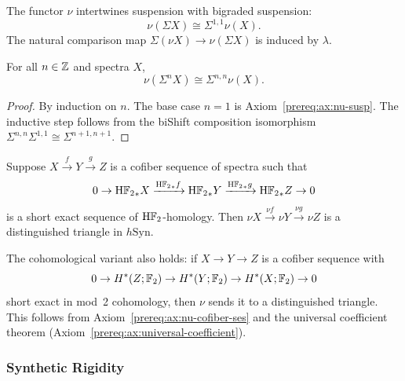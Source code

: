 \begin{axiom}\label{prereq:ax:nu-susp}
    \leanok
    The functor $\nu$ intertwines suspension with bigraded suspension:
    $$\nu(\Sigma X) \cong \Sigma^{1,1} \nu(X).$$
    The natural comparison map $\Sigma(\nu X) \to \nu(\Sigma X)$ is induced by $\lambda$.
\end{axiom}

\begin{theorem}\label{prereq:thm:nu-shift-bishift}
    For all $n \in {\mathbb Z}$ and spectra $X$,
    $$\nu(\Sigma^n X) \cong \Sigma^{n,n}\nu(X).$$
\end{theorem}
\begin{proof}
    By induction on $n$. The base case $n = 1$ is Axiom~\ref{prereq:ax:nu-susp}. The inductive step follows from the biShift composition isomorphism $\Sigma^{n,n}\Sigma^{1,1} \cong \Sigma^{n+1,n+1}$.
\end{proof}

\begin{axiom}\label{prereq:ax:nu-cofiber-ses}
    \leanok
    Suppose $X \xrightarrow{f} Y \xrightarrow{g} Z$ is a cofiber sequence of spectra such that
    $$0 \to {\mathrm{H}{\mathbb F}_2}_*X \xrightarrow{{\mathrm{H}{\mathbb F}_2}_*f} {\mathrm{H}{\mathbb F}_2}_*Y \xrightarrow{{\mathrm{H}{\mathbb F}_2}_*g} {\mathrm{H}{\mathbb F}_2}_*Z \to 0$$
    is a short exact sequence of $\mathrm{H}{\mathbb F}_2$-homology. Then $\nu X \xrightarrow{\nu f} \nu Y \xrightarrow{\nu g} \nu Z$ is a distinguished triangle in $h\mathrm{Syn}$.
\end{axiom}

\begin{remark}\label{prereq:rem:nu-cofiber-cohomological}
    The cohomological variant also holds: if $X \to Y \to Z$ is a cofiber sequence with
    $$0 \to H^*(Z; {\mathbb F}_2) \to H^*(Y; {\mathbb F}_2) \to H^*(X; {\mathbb F}_2) \to 0$$
    short exact in mod~2 cohomology, then $\nu$ sends it to a distinguished triangle. This follows from Axiom~\ref{prereq:ax:nu-cofiber-ses} and the universal coefficient theorem (Axiom~\ref{prereq:ax:universal-coefficient}).
\end{remark}

\subsubsection{Synthetic Rigidity}\label{sec:prereq-syn-rigidity}

